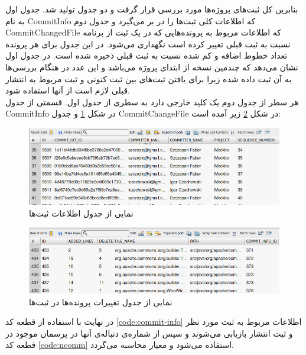  بنابرین کل ثبت‌های پروژه‌ها مورد بررسی قرار گرفت و دو جدول تولید شد.
جدول اول به نام CommitInfo‌ که اطلاعات کلی ثبت‌ها را در بر می‌گیرد و جدول دوم  CommitChangedFile که اطلاعات مربوط به پرونده‌هایی که در یک ثبت از برنامه نسبت به ثبت قبلی تغییر کرده است نگهداری می‌شود.  در این جدول برای هر پرونده تعداد خطوط اضافه و کم شده نسبت به ثبت قبلی ذخیره شده است. در جدول اول  نشان می‌دهد که چندمین نسخه از ابتدای پروژه می‌باشد و این عدد در هنگام بررسی‌ها به آن ثبت داده‌ شده زیرا برای یافتن ثبت‌های بین ثبت کنونی و ثبت مربوط به انتشار قبلی لازم است از آنها استفاده شود. \\
  هر سطر از جدول دوم یک کلید خارجی دارد به سطری از جدول اول. قسمتی از جدول CommitInfo  در شکل \ref{fig:commit-info} و جدول CommitChangeFile در شکل \ref{fig:change-file-info}  زیر آمده است:

\begin{figure}[H]
	\centering
	\includegraphics[width=1\textwidth]{img/case_study/commit-info.png}
	\caption{نمایی از جدول اطلاعات ثبت‌ها}
	\label{fig:commit-info}
\end{figure}


\begin{figure}[H]
	\centering
	\includegraphics[width=1\textwidth]{img/case_study/change-file-info.png}
	\caption{ نمایی از جدول تغییرات پرونده‌ها در ثبت‌ها }
	\label{fig:change-file-info}
\end{figure}

در نهایت با استفاده از قطعه کد \ref{code:commit-info} اطلاعات مربوط به ثبت مورد نظر و ثبت انتشار بازیابی می‌شوند و سپس  از شماره‌ی دنباله‌ی آنها در پرسمان موجود در قطعه کد \ref{code:ncomm} استفاده می‌شود و معیار محاسبه می‌گردد.




